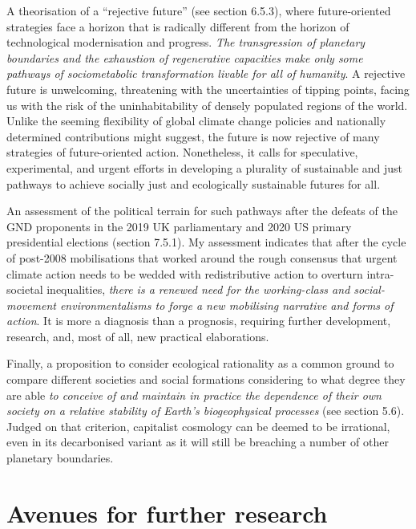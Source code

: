 \documentclass[a4paper, nobind]{templates/ociamthesis}
\begin{document}
A theorisation of a ``rejective future'' (see section 6.5.3), where future-oriented strategies face a horizon that is radically different from the horizon of technological modernisation and progress. \emph{The transgression of planetary boundaries and the exhaustion of regenerative capacities make only some pathways of sociometabolic transformation livable for all of humanity}. A rejective future is unwelcoming, threatening with the uncertainties of tipping points, facing us with the risk of the uninhabitability of densely populated regions of the world. Unlike the seeming flexibility of global climate change policies and nationally determined contributions might suggest, the future is now rejective of many strategies of future-oriented action. Nonetheless, it calls for speculative, experimental, and urgent efforts in developing a plurality of sustainable and just pathways to achieve socially just and ecologically sustainable futures for all.

An assessment of the political terrain for such pathways after the defeats of the GND proponents in the 2019 UK parliamentary and 2020 US primary presidential elections (section 7.5.1). My assessment indicates that after the cycle of post-2008 mobilisations that worked around the rough consensus that urgent climate action needs to be wedded with redistributive action to overturn intra-societal inequalities, \emph{there is a renewed need for the working-class and social-movement environmentalisms to forge a new mobilising narrative and forms of action}. It is more a diagnosis than a prognosis, requiring further development, research, and, most of all, new practical elaborations.

Finally, a proposition to consider ecological rationality as a common ground to compare different societies and social formations considering to what degree they are able \emph{to conceive of and maintain in practice the dependence of their own society on a relative stability of Earth's biogeophysical processes} (see section 5.6). Judged on that criterion, capitalist cosmology can be deemed to be irrational, even in its decarbonised variant as it will still be breaching a number of other planetary boundaries.

\hypertarget{avenues-for-further-research}{%
\section{Avenues for further research}\label{avenues-for-further-research}}
\end{document}
